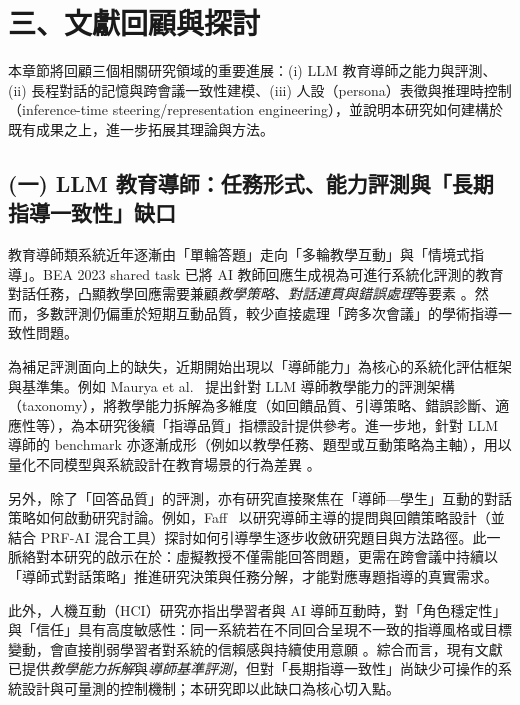 \section*{三、文獻回顧與探討}

本章節將回顧三個相關研究領域的重要進展：(i) LLM 教育導師之能力與評測、(ii) 長程對話的記憶與跨會議一致性建模、(iii) 人設（persona）表徵與推理時控制（inference-time steering/representation engineering），並說明本研究如何建構於既有成果之上，進一步拓展其理論與方法。

\subsection*{(一) LLM 教育導師：任務形式、能力評測與「長期指導一致性」缺口}
教育導師類系統近年逐漸由「單輪答題」走向「多輪教學互動」與「情境式指導」。BEA 2023 shared task 已將 AI 教師回應生成視為可進行系統化評測的教育對話任務，凸顯教學回應需要兼顧\emph{教學策略、對話連貫與錯誤處理}等要素 \citep{tack-etal-2023-bea}。然而，多數評測仍偏重於短期互動品質，較少直接處理「跨多次會議」的學術指導一致性問題。

為補足評測面向上的缺失，近期開始出現以「導師能力」為核心的系統化評估框架與基準集。例如 Maurya et al.~\citep{maurya-etal-2025-unifying} 提出針對 LLM 導師教學能力的評測架構（taxonomy），將教學能力拆解為多維度（如回饋品質、引導策略、錯誤診斷、適應性等），為本研究後續「指導品質」指標設計提供參考。進一步地，針對 LLM 導師的 benchmark 亦逐漸成形（例如以教學任務、題型或互動策略為主軸），用以量化不同模型與系統設計在教育場景的行為差異 \citep{a2510_02663v1_tutorbench,a2601_21375v1_teachbench}。

另外，除了「回答品質」的評測，亦有研究直接聚焦在「導師—學生」互動的對話策略如何啟動研究討論。例如，Faff~\citep{faff2024prfai_ssrn4999390} 以研究導師主導的提問與回饋策略設計（並結合 PRF-AI 混合工具）探討如何引導學生逐步收斂研究題目與方法路徑。此一脈絡對本研究的啟示在於：虛擬教授不僅需能回答問題，更需在跨會議中持續以「導師式對話策略」推進研究決策與任務分解，才能對應專題指導的真實需求。

此外，人機互動（HCI）研究亦指出學習者與 AI 導師互動時，對「角色穩定性」與「信任」具有高度敏感性：同一系統若在不同回合呈現不一致的指導風格或目標變動，會直接削弱學習者對系統的信賴感與持續使用意願 \citep{tutorup_chi2025,mentigo_chi2025}。綜合而言，現有文獻已提供\emph{教學能力拆解}與\emph{導師基準評測}，但對「長期指導一致性」尚缺少可操作的系統設計與可量測的控制機制；本研究即以此缺口為核心切入點。

